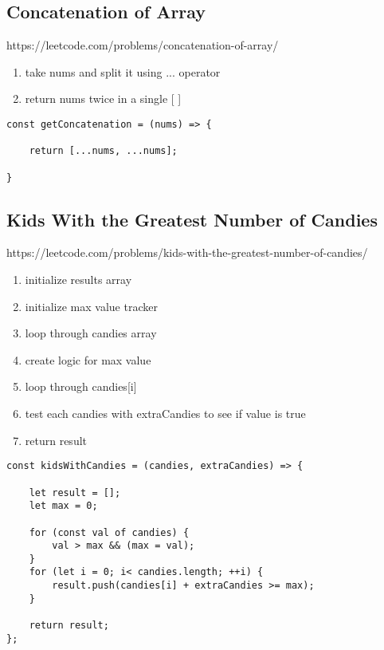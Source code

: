 \documentclass[10pt]{article}
\begin{document}
\pagebreak
\medskip %
\subsection{Concatenation of Array}
https://leetcode.com/problems/concatenation-of-array/

\begin{enumerate}
	\item take nums and split it using ... operator
	\item return nums twice in a single [ ]
\end{enumerate}

\begin{lstlisting}[title=Solution getConcatenation, captionpos=t]
const getConcatenation = (nums) => {

    return [...nums, ...nums];
    
}
\end{lstlisting}
\medskip %

\pagebreak
\medskip %
\subsection{Kids With the Greatest Number of Candies}
https://leetcode.com/problems/kids-with-the-greatest-number-of-candies/

\begin{enumerate}
	\item initialize results array
	\item initialize max value tracker
	\item loop through candies array 
	\item create logic for max value
	\item loop through candies[i]
	\item test each candies with extraCandies to see if value is true 
	\item return result 
\end{enumerate}

\begin{lstlisting}[title=Solution kidsWithCandies with for-of loop, captionpos=t]
const kidsWithCandies = (candies, extraCandies) => {

    let result = [];
    let max = 0;

    for (const val of candies) {
        val > max && (max = val);
    }
    for (let i = 0; i< candies.length; ++i) {
        result.push(candies[i] + extraCandies >= max);
    }

    return result; 
};
\end{lstlisting}
\end{document}
